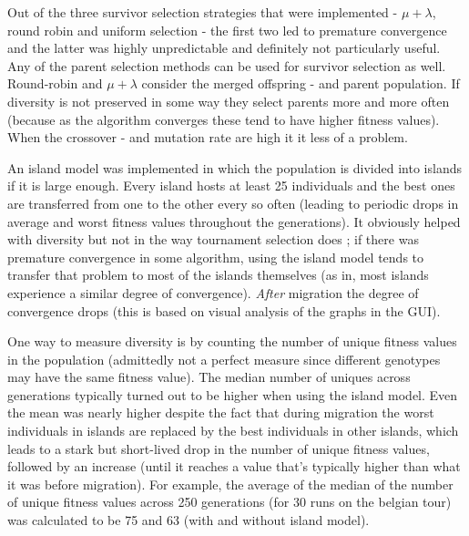 
Out of the three survivor selection strategies that were implemented - $\mu+\lambda$, round robin and uniform selection - the first two led to premature convergence and the latter was highly unpredictable and definitely not particularly useful. Any of the parent selection methods can be used for survivor selection as well. Round-robin and $\mu+\lambda$ consider the merged offspring - and parent population. If diversity is not preserved in some way they select parents more and more often (because as the algorithm converges these tend to have higher fitness values). When the crossover - and mutation rate are high it it less of a problem.


An island model was implemented in which the population is divided into islands if it is large enough. Every island hosts at least 25 individuals and the best ones are transferred from one to the other every so often (leading to periodic drops in average and worst fitness values throughout the generations). It obviously helped with diversity but not in the way tournament selection does ; if there was premature convergence in some algorithm, using the island model tends to transfer that problem to most of the islands themselves (as in, most islands experience a similar degree of convergence). \textit{After} migration the degree of convergence drops (this is based on visual analysis of the graphs in the GUI). \\

\par\noindent One way to measure diversity is by counting the number of unique fitness values in the population (admittedly not a perfect measure since different genotypes may have the same fitness value). The median number of uniques across generations typically turned out to be higher when using the island model. Even the mean was nearly higher despite the fact that during migration the worst individuals in islands are replaced by the best individuals in other islands, which leads to a stark but short-lived drop in the number of unique fitness values, followed by an increase (until it reaches a value that's typically higher than what it was before migration). For example, the average of the median of the number of unique fitness values across 250 generations (for 30 runs on the belgian tour) was calculated to be 75 and 63 (with and without island model).

